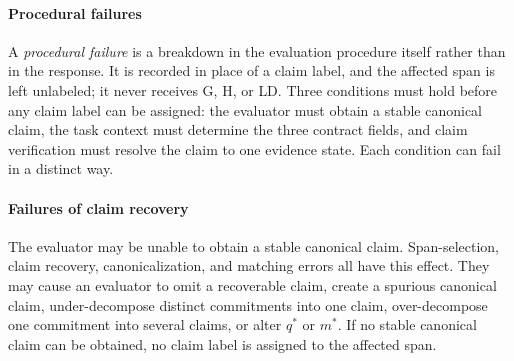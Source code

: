 \documentclass{clv2025}
\newcommand{\LD}{\textsc{LD}}
\newcommand{\Hall}{\textsc{H}}
\newcommand{\Grd}{\textsc{G}}
\begin{document}
\paragraph{Procedural failures}

A \emph{procedural failure} is a breakdown in the evaluation procedure itself
rather than in the response.
It is recorded in place of a claim label, and the affected span is left
unlabeled; it never receives \Grd, \Hall, or \LD.
Three conditions must hold before any claim label can be assigned: the
evaluator must obtain a stable canonical claim, the task context must determine
the three contract fields, and claim verification must resolve the claim to one
evidence state.
Each condition can fail in a distinct way.

\paragraph{Failures of claim recovery}
The evaluator may be unable to obtain a stable canonical claim.
Span-selection, claim recovery, canonicalization, and matching errors all have
this effect.
They may cause an evaluator to omit a recoverable claim, create a spurious
canonical claim, under-decompose distinct commitments into one claim,
over-decompose one commitment into several claims, or alter $q^*$ or $m^*$.
If no stable canonical claim can be obtained, no claim label is assigned to the
affected span.
\end{document}

